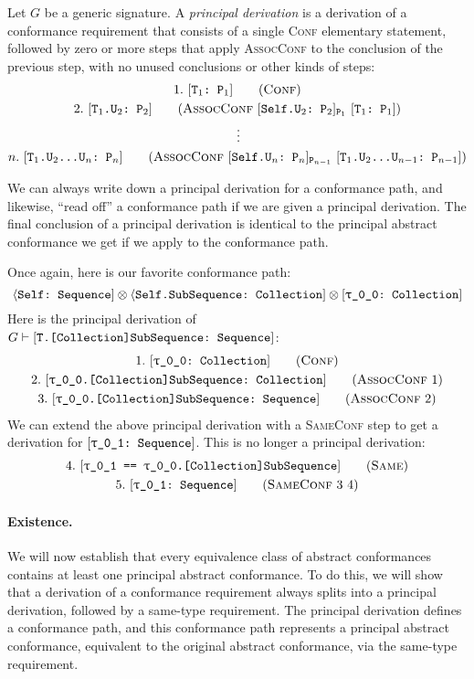 \documentclass[../generics]{subfiles}
\begin{document}
\begin{definition}\label{principal derivation def}
Let $G$ be a generic signature. A \emph{principal derivation} is a derivation of a conformance requirement that consists of a single \textsc{Conf} elementary statement, followed by zero or more steps that apply \textsc{AssocConf} to the conclusion of the previous step, with no unused conclusions or other kinds of steps:
\begin{gather*}
\ConfStep{$\tT_1$}{$\tP_1$}{1}\\
\AssocConfStep{$\AssocConfReq{Self.$\tU_2$}{$\tP_2$}{$\tP_1$}$ $\TPOne$}{$\tT_1$.$\tU_2$}{$\tP_2$}{2}\\
\,\vdots\\
\AssocConfStep{$\AssocConfReq{Self.$\tU_n$}{$\tP_n$}{$\tP_{n-1}$}$ $\ConfReq{$\tT_1$.$\tU_2$...$\tU_{n-1}$}{$\tP_{n-1}$}$}{$\tT_1$.$\tU_2$...$\tU_n$}{$\tP_n$}{n}
\end{gather*}
\end{definition}
We can always write down a principal derivation for a conformance path, and likewise, ``read off'' a conformance path if we are given a principal derivation. The final conclusion of a principal derivation is identical to the principal abstract conformance we get if we apply  to the conformance path.

\begin{example}
Once again, here is our favorite conformance path:
\[\SelfSequence \otimes \SelfSubSequence \otimes \rTCollection\]
Here is the principal derivation of $G\vdash[\texttt{T.[Collection]SubSequence:~Sequence}]$:
\begin{gather*}
\ConfStep{\rT}{Collection}{1}\\
\AssocConfStep{1}{\rT.[Collection]SubSequence}{Collection}{2}\\
\AssocConfStep{2}{\rT.[Collection]SubSequence}{Sequence}{3}
\end{gather*}
We can extend the above principal derivation with a \textsc{SameConf} step to get a derivation for $\rUSequence$. This is no longer a principal derivation:
\begin{gather*}
\SameStep{\rU}{\rT.[Collection]SubSequence}{4}\\
\SameConfStep{3}{4}{\rU}{Sequence}{5}
\end{gather*}
\end{example}

\paragraph{Existence.} We will now establish that every equivalence class of abstract conformances contains at least one principal abstract conformance. To do this, we will show that a derivation of a conformance requirement always splits into a principal derivation, followed by a same-type requirement. The principal derivation defines a conformance path, and this conformance path represents a principal abstract conformance, equivalent to the original abstract conformance, via the same-type requirement.
\end{document}
